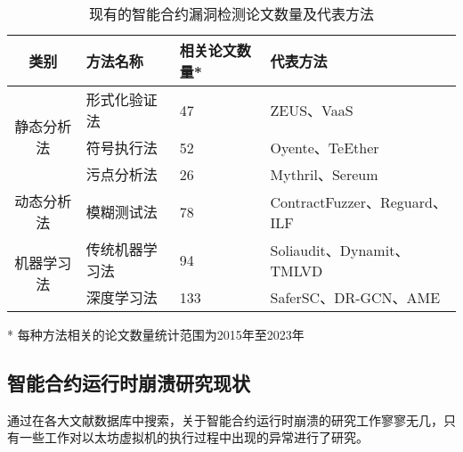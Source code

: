 \begin{table}[htbp]
    \caption{\label{tab:defect_detection_methods}现有的智能合约漏洞检测论文数量及代表方法}
    \small
    \begin{threeparttable}
        {
            \renewcommand{\arraystretch}{1.5}
        \begin{tabularx}{\linewidth}{cp{3cm}<{\centering}p{3cm}<{\centering}X<{\centering}}
            \toprule
            类别                     & 方法名称   & 相关论文数量* & 代表方法 \\ \midrule
            \multirow{3}{*}{静态分析法} & 形式化验证法 & 47    & ZEUS\cite{kalra2018zeus}、VaaS\cite{garfatta2021survey}  \\
                                   & 符号执行法  & 52    & Oyente\cite{luu2016making}、TeEther\cite{krupp2018teether}  \\
                                   & 污点分析法  & 26    & Mythril\cite{mythril}、Sereum\cite{rodler2018sereum}  \\ \midrule
            动态分析法                  & 模糊测试法  & 78    & ContractFuzzer\cite{jiang2018contractfuzzer}、Reguard\cite{liu2018reguard}、ILF\cite{he2019learning}  \\ \midrule
            \multirow{2}{*}{机器学习法} & 传统机器学习法  & 94    & Soliaudit\cite{liao2019soliaudit}、Dynamit\cite{Dynamit}、TMLVD\cite{TMLVD}  \\
                                   & 深度学习法  & 133    & SaferSC\cite{tann2018towards}、DR-GCN\cite{zhuang2021smart}、AME\cite{liu2021smart}  \\ \bottomrule
        \end{tabularx}
        }
        \begin{tablenotes}
            \footnotesize
            \item[*] 每种方法相关的论文数量统计范围为2015年至2023年
        \end{tablenotes}
    \end{threeparttable}
\end{table}

\subsection{智能合约运行时崩溃研究现状}
\label{sec:智能合约运行时崩溃研究现状}
通过在各大文献数据库中搜索，关于智能合约运行时崩溃的研究工作寥寥无几，只有一些工作对以太坊虚拟机的执行过程中出现的异常进行了研究。


